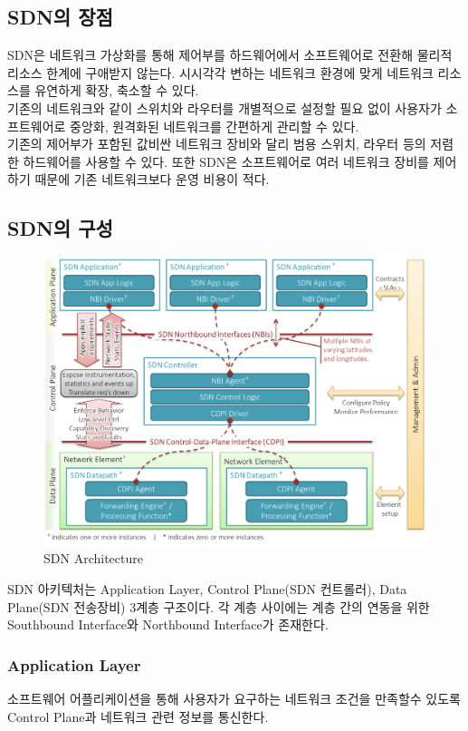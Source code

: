 \subsection{SDN의 장점}
    SDN은 네트워크 가상화를 통해 제어부를 하드웨어에서 소프트웨어로 전환해 물리적 리소스 한계에 구애받지 않는다. 시시각각 변하는 네트워크 환경에 맞게 네트워크 리소스를 유연하게 확장, 축소할 수 있다. \\
    기존의 네트워크와 같이 스위치와 라우터를 개별적으로 설정할 필요 없이 사용자가 소프트웨어로 중앙화, 원격화된 네트워크를 간편하게 관리할 수 있다. \\
    기존의 제어부가 포함된 값비싼 네트워크 장비와 달리 범용 스위치, 라우터 등의 저렴한 하드웨어를 사용할 수 있다. 또한 SDN은 소프트웨어로 여러 네트워크 장비를 제어하기 때문에 기존 네트워크보다 운영 비용이 적다. \\
    
\subsection{SDN의 구성}
    \vspace{-4mm}
    \begin{figure}[!h]\centering
		\includegraphics[width=.65\textwidth]{image/week05/1-2.png}
		\caption{\small SDN Architecture}
		\vspace{-10pt}
    \end{figure}
    SDN 아키텍처는 Application Layer, Control Plane(SDN 컨트롤러), Data Plane(SDN 전송장비) 3계층 구조이다. 각 계층 사이에는 계층 간의 연동을 위한 Southbound Interface와 Northbound Interface가 존재한다.
    
    \subsubsection*{Application Layer}
    소프트웨어 어플리케이션을 통해 사용자가 요구하는 네트워크 조건을 만족할수 있도록 Control Plane과 네트워크 관련 정보를 통신한다. \\
    
